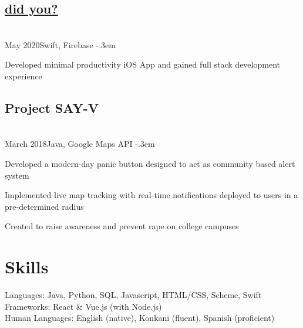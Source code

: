 \documentclass{article}
\let\olditemize=\itemize \let\endolditemize=\enditemize
\renewenvironment{itemize}{\olditemize[topsep=0em] \itemsep-.3em}{\endolditemize}
\newcommand{\entry}[3]{\quad\textbf{#1}\\#2\qquad#3}
\begin{document}
	\subsection{\texorpdfstring{\protect\href{https://github.com/jaykudva/did-you-}{did you?}} ?}
	\entry{}{May 2020}{Swift, Firebase}
	\begin{itemize}
		\item Developed minimal productivity iOS App and gained full stack development experience 
	\end{itemize}
	\subsection{Project SAY-V}
	\entry{}{March 2018}{Java, Google Maps API}
	\begin{itemize}
		\item Developed a modern-day panic button designed to act as community based alert system
		\item Implemented live map tracking with real-time notifications deployed to users in a pre-determined radius
		\item Created to raise awareness and prevent rape on college campuses
	\end{itemize}
	
	\section{Skills}
	Languages:
	Java, Python, SQL, Javascript, HTML/CSS, Scheme, Swift \\
	Frameworks:
	React \& Vue.js (with Node.js) \\
	Human Languages:
	English (native), Konkani (fluent), Spanish (proficient)
	
	
\end{document}
